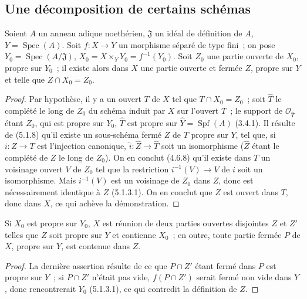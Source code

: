 \subsection{Une décomposition de certains schémas}
\label{subsection:III.5.5-fr}

\begin{proposition}[5.5.1]
\label{III.5.5.1-fr}
Soient $A$ un anneau adique noethérien, $\mathfrak J$ un idéal de définition
de $A$, $Y=\operatorname{Spec}(A)$. Soit $f:X\to Y$ un morphisme séparé de
type fini~; on pose $Y_0=\operatorname{Spec}(A/\mathfrak J)$,
$X_0=X\times_Y Y_0=f^{-1}(Y_0)$. Soit $Z_0$ une partie ouverte de $X_0$,
propre sur $Y_0$~; il existe alors dans $X$ une partie ouverte et fermée $Z$,
propre sur $Y$ et telle que $Z\cap X_0=Z_0$.
\end{proposition}

\begin{proof}
Par hypothèse, il y a un ouvert $T$ de $X$ tel que $T\cap X_0=Z_0$~; soit
$\widehat T$ le complété le long de $Z_0$ du schéma induit par $X$ sur
l'ouvert $T$~; le support de $\mathcal O_{\widehat T}$ étant $Z_0$, qui est
propre sur $Y_0$, $\widehat T$ est propre sur
$\widehat Y=\operatorname{Spf}(A)$ (3.4.1). Il résulte de (5.1.8) qu'il existe
un sous-schéma fermé $Z$ de $T$ propre sur $Y$, tel que, si $i:Z\to T$ est
l'injection canonique, $\widehat i:\widehat Z\to\widehat T$ soit un
isomorphisme ($\widehat Z$ étant le complété de $Z$ le long de $Z_0$). On en
conclut (4.6.8) qu'il existe dans $T$ un voisinage ouvert $V$ de $Z_0$ tel que
la restriction $i^{-1}(V)\to V$ de $i$ soit un isomorphisme. Mais
$i^{-1}(V)$ est un voisinage de $Z_0$ dans $Z$, donc est nécessairement
identique à $Z$ (5.1.3.1). On en conclut que $Z$ est ouvert dans $T$, donc
dans $X$, ce qui achève la démonstration.
\end{proof}

\begin{corollary}[5.5.2]
\label{III.5.5.2-fr}
Si $X_0$ est propre sur $Y_0$, $X$ est réunion de deux parties ouvertes
disjointes $Z$ et $Z'$ telles que $Z$ soit propre sur $Y$ et contienne $X_0$~;
en outre, toute partie fermée $P$ de $X$, propre sur $Y$, est contenue dans
$Z$.
\end{corollary}

\begin{proof}
La dernière assertion résulte de ce que $P\cap Z'$ étant fermé dans $P$ est
propre sur $Y$~; si $P\cap Z'$ n'était pas vide, $f(P\cap Z')$ serait fermé
non vide dans $Y$, donc rencontrerait $Y_0$ (5.1.3.1), ce qui contredit la
définition de $Z$.
\end{proof}

